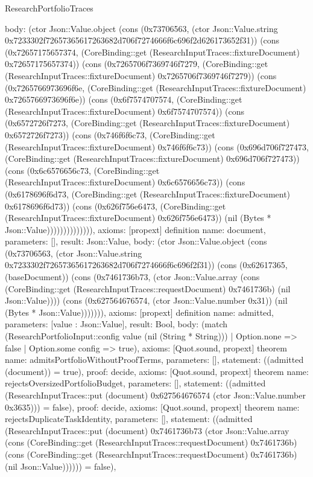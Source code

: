 \begin{lexlean}{ResearchPortfolioTraces}
\begin{semanticmodule}
{ body: (ctor Json::Value.object (cons (0x73706563, (ctor Json::Value.string 0x7233302f72657365617263682d706f7274666f6c696f2d626173652f31)) (cons (0x72657175657374, (CoreBinding::get (ResearchInputTraces::fixtureDocument) 0x72657175657374)) (cons (0x7265706f7369746f7279, (CoreBinding::get (ResearchInputTraces::fixtureDocument) 0x7265706f7369746f7279)) (cons (0x7265766973696f6e, (CoreBinding::get (ResearchInputTraces::fixtureDocument) 0x7265766973696f6e)) (cons (0x6f7574707574, (CoreBinding::get (ResearchInputTraces::fixtureDocument) 0x6f7574707574)) (cons (0x6572726f7273, (CoreBinding::get (ResearchInputTraces::fixtureDocument) 0x6572726f7273)) (cons (0x746f6f6c73, (CoreBinding::get (ResearchInputTraces::fixtureDocument) 0x746f6f6c73)) (cons (0x696d706f727473, (CoreBinding::get (ResearchInputTraces::fixtureDocument) 0x696d706f727473)) (cons (0x6c6576656c73, (CoreBinding::get (ResearchInputTraces::fixtureDocument) 0x6c6576656c73)) (cons (0x6178696f6d73, (CoreBinding::get (ResearchInputTraces::fixtureDocument) 0x6178696f6d73)) (cons (0x626f756e6473, (CoreBinding::get (ResearchInputTraces::fixtureDocument) 0x626f756e6473)) (nil (Bytes * Json::Value)))))))))))))),
 axioms: [propext]
}
definition{
 name: document,
 parameters: [],
 result: Json::Value,
 body: (ctor Json::Value.object (cons (0x73706563, (ctor Json::Value.string 0x7233302f72657365617263682d706f7274666f6c696f2f31)) (cons (0x62617365, (baseDocument)) (cons (0x7461736b73, (ctor Json::Value.array (cons (CoreBinding::get (ResearchInputTraces::requestDocument) 0x7461736b) (nil Json::Value)))) (cons (0x627564676574, (ctor Json::Value.number 0x31)) (nil (Bytes * Json::Value))))))),
 axioms: [propext]
}
definition{
 name: admitted,
 parameters: [value : Json::Value],
 result: Bool,
 body: (match (ResearchPortfolioInput::config value (nil (String * String))) | Option.none => false | Option.some config => true),
 axioms: [Quot.sound, propext]
}
theorem{
 name: admitsPortfolioWithoutProofTerms,
 parameters: [],
 statement: ((admitted (document)) = true),
 proof: decide{},
 axioms: [Quot.sound, propext]
}
theorem{
 name: rejectsOversizedPortfolioBudget,
 parameters: [],
 statement: ((admitted (ResearchInputTraces::put (document) 0x627564676574 (ctor Json::Value.number 0x3635))) = false),
 proof: decide{},
 axioms: [Quot.sound, propext]
}
theorem{
 name: rejectsDuplicateTaskIdentity,
 parameters: [],
 statement: ((admitted (ResearchInputTraces::put (document) 0x7461736b73 (ctor Json::Value.array (cons (CoreBinding::get (ResearchInputTraces::requestDocument) 0x7461736b) (cons (CoreBinding::get (ResearchInputTraces::requestDocument) 0x7461736b) (nil Json::Value)))))) = false),
}
\end{semanticmodule}
\end{lexlean}
